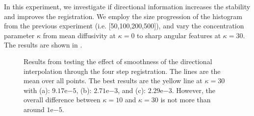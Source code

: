 \documentclass[twocolumn]{svjour3}
\begin{document}
In this experiment, we investigate if directional information increases the stability and
improves the registration. We employ the size progression of the histogram from the
previous experiment (i.e. [50,100,200,500]), and vary the concentration parameter $\kappa$
from mean diffusivity at $\kappa=0$ to sharp angular features at $\kappa=30$. The results
are shown in .
\begin{figure}[!htb]
  \centering
  \hspace*{0cm}
  \hspace*{0cm}  
  \caption{Results from testing the effect of smoothness of the directional interpolation
    through the four step registration. The lines are the mean over all points. The best
    results are the yellow line at $\kappa=30$ with (a): $9.17\mathrm{e}{-5}$, (b):
    $2.71\mathrm{e}{-3}$, and (c): $2.29\mathrm{e}{-3}$. However, the overall difference
    between $\kappa=10$ and $\kappa=30$ is not more than around $1\mathrm{e}{-5}$.}
  \label{fig:kappatest}
\end{figure}
\end{document}
